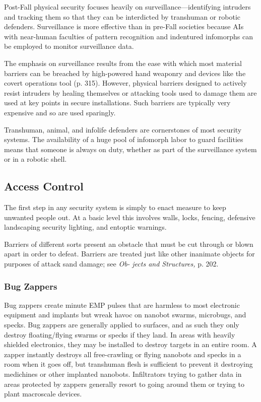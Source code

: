 Post-Fall physical security focuses heavily on surveillance—identifying intruders and tracking them so that they can be interdicted by transhuman or robotic defenders. Surveillance is more effective than in pre-Fall societies because AIs with near-human faculties of pattern recognition and indentured infomorphs can be employed to monitor surveillance data. 

The emphasis on surveillance results from the ease with which most material barriers can be breached by high-powered hand weaponry and devices like the covert operations tool (p. 315). However, physical barriers designed to actively resist intruders by healing themselves or attacking tools used to damage them are used at key points in secure installations. Such barriers are typically very expensive and so are used sparingly. 

Transhuman, animal, and infolife defenders are cornerstones of most security systems. The availability of a huge pool of infomorph labor to guard facilities means that someone is always on duty, whether as part of the surveillance system or in a robotic shell. 

\subsection{Access Control} 

The first step in any security system is simply to enact measure to keep unwanted people out. At a basic level this involves walls, locks, fencing, defensive landscaping security lighting, and entoptic warnings. 

Barriers of different sorts present an obstacle that must be cut through or blown apart in order to defeat. Barriers are treated just like other inanimate objects for purposes of attack sand damage; see \textit{Ob-} \textit{jects and Structures,} p. 202. 

\subsubsection{Bug Zappers} 

Bug zappers create minute EMP pulses that are harmless to most electronic equipment and implants but wreak havoc on nanobot swarms, microbugs, and specks. Bug zappers are generally applied to surfaces, and as such they only destroy floating/flying swarms or specks if they land. In areas with heavily shielded electronics, they may be installed to destroy targets in an entire room. A zapper instantly destroys all free-crawling or flying nanobots and specks in a room when it goes off, but transhuman flesh is sufficient to prevent it destroying medichines or other implanted nanobots. Infiltrators trying to gather data in areas protected by zappers generally resort to going around them or trying to plant macroscale devices. 

